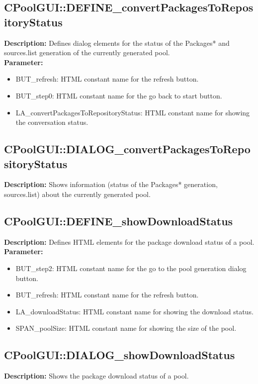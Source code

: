\subsection{CPoolGUI::DEFINE\_convertPackagesToRepositoryStatus}
\textbf{Description:} Defines dialog elements for the status of the Packages*  and sources.list generation of the currently generated pool.\\
\textbf{Parameter:}
\begin{itemize}
\item BUT\_refresh: HTML constant name for the refresh button.
\item BUT\_step0: HTML constant name for the go back to start button.
\item LA\_convertPackagesToRepositoryStatus: HTML constant name for showing the conversation status.
\end{itemize}

\subsection{CPoolGUI::DIALOG\_convertPackagesToRepositoryStatus}
\textbf{Description:} Shows information (status of the Packages* generation, sources.list) about the currently generated pool.\\

\subsection{CPoolGUI::DEFINE\_showDownloadStatus}
\textbf{Description:} Defines HTML elements for the package download status of a pool.\\
\textbf{Parameter:}
\begin{itemize}
\item BUT\_step2: HTML constant name for the go to the pool generation dialog button.
\item BUT\_refresh: HTML constant name for the refresh button.
\item LA\_downloadStatus: HTML constant name for showing the download status.
\item SPAN\_poolSize: HTML constant name for showing the size of the pool.
\end{itemize}

\subsection{CPoolGUI::DIALOG\_showDownloadStatus}
\textbf{Description:} Shows the package download status of a pool.\\

